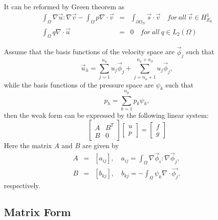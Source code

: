 \documentclass[a4paper]{article}
\begin{document}
It can be reformed by Green theorem as 
\begin{equation}
\begin{array}{rcl}
\int_\Omega \nabla \vec{u} : \nabla \vec{v} - \int_\Omega p\nabla \cdot \vec{v} &=& \int_{\partial \Omega_N}\vec{s}\cdot \vec{v} \quad for \ all \ \vec{v} \in H^1_{E_0}\\
\int_\Omega q\nabla \cdot \vec{u} &=& 0 \quad for \ all \ q\in L_2(\Omega)
\label{eq::Stokes}
\end{array}
\end{equation}

Assume that the basis functions of the velocity space are {$\vec{\phi}_j$} such that
\begin{equation}
\vec{u}_h = \sum^{n_u}_{j=1}u_j\vec{\phi}_j + \sum^{n_u + n_\partial}_{j=n_u+1}u_j\vec{\phi}_j,
\label{eq::Stokes-u}
\end{equation}
while the basis functions of the pressure space are $\psi_k$ such that
\begin{equation}
p_h = \sum^{n_p}_{k=1}p_k\psi_k,
\label{eq::Stokes-p}
\end{equation}
then the weak form can be expressed by the following linear system:
\begin{equation}
\left[ \begin{array}{ccc}
A & B^T \\
B & 0
\end{array}
\right]
\left[\begin{array}{ccc}
u\\
p
\end{array}
\right]=
\left[\begin{array}{ccc}
f\\
g
\end{array}
\right]
\label{mt::Stokes}
\end{equation}
Here the matrix $A$ and $B$ are given by
\begin{equation}
\begin{array}{rcl}
A &=& [a_{ij}], \quad a_{ij} = \int_{\Omega} \nabla \vec{\phi}_i : \nabla \vec{\phi}_j,\\
B &=& [b_{kj}], \quad b_{kj} = -\int_{\Omega} \psi_k\nabla \cdot \vec{\phi_j},
\end{array}
\end{equation}
respectively.

\subsection{Matrix Form}
\end{document}

